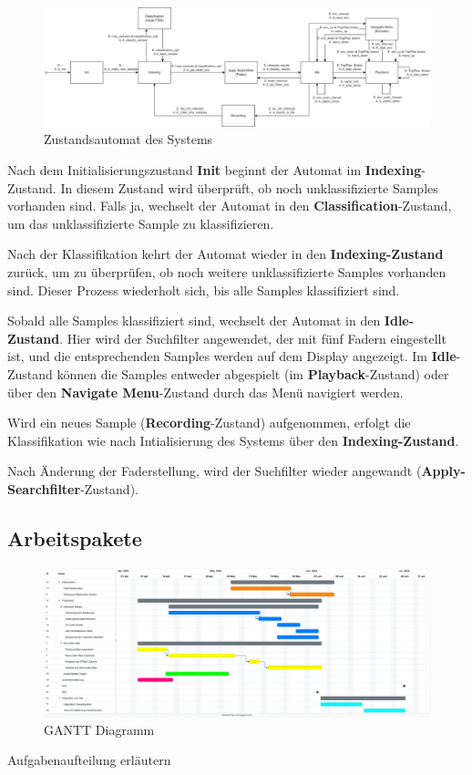 \begin{figure}[H]
   	\centering
   	\includegraphics[width=1.0\textwidth]{images/04_spezifikation/fsm.drawio.png}
   	\caption{Zustandsautomat des Systems}
   	\label{fig:fsm}
\end{figure}

Nach dem Initialisierungszustand \textbf{Init} beginnt der Automat im \textbf{Indexing}-Zustand. In diesem Zustand wird überprüft, ob noch unklassifizierte Samples vorhanden sind. Falls ja, wechselt der Automat in den \textbf{Classification}-Zustand, um das unklassifizierte Sample zu klassifizieren. 

Nach der Klassifikation kehrt der Automat wieder in den \textbf{Indexing-Zustand} zurück, um zu überprüfen, ob noch weitere unklassifizierte Samples vorhanden sind. Dieser Prozess wiederholt sich, bis alle Samples klassifiziert sind.

Sobald alle Samples klassifiziert sind, wechselt der Automat in den \textbf{Idle-Zustand}. Hier wird der Suchfilter angewendet, der mit fünf Fadern eingestellt ist, und die entsprechenden Samples werden auf dem Display angezeigt. Im \textbf{Idle}-Zustand können die Samples entweder abgespielt (im \textbf{Playback}-Zustand) oder über den \textbf{Navigate Menu}-Zustand durch das Menü navigiert werden.

Wird ein neues Sample (\textbf{Recording}-Zustand) aufgenommen, erfolgt die Klassifikation wie nach Intialisierung des Systems über den \textbf{Indexing-Zustand}.

Nach Änderung der Faderstellung, wird der Suchfilter wieder angewandt (\textbf{Apply-Searchfilter}-Zustand).

\subsection{Arbeitspakete}

    \begin{figure}[H]
	\centering
	\includegraphics[width=1.0\textwidth]{images/04_spezifikation/gantt.png}
	\caption{GANTT Diagramm}
	\label{fig:gantt}
\end{figure}


Aufgabenaufteilung erläutern